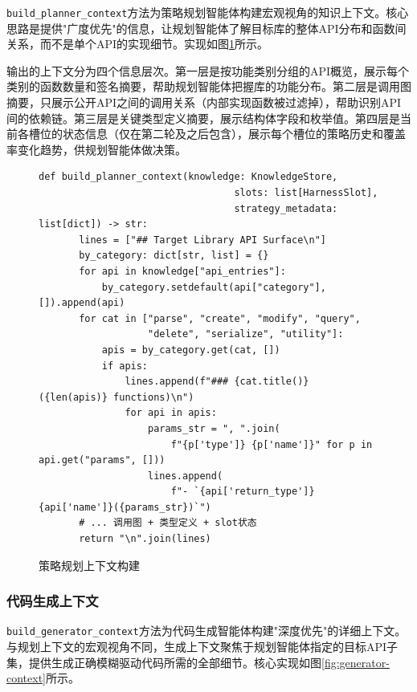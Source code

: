 \texttt{build\_planner\_context}方法为策略规划智能体构建宏观视角的知识上下文。核心思路是提供"广度优先"的信息，让规划智能体了解目标库的整体API分布和函数间关系，而不是单个API的实现细节。实现如图\ref{fig:planner-context}所示。

输出的上下文分为四个信息层次。第一层是按功能类别分组的API概览，展示每个类别的函数数量和签名摘要，帮助规划智能体把握库的功能分布。第二层是调用图摘要，只展示公开API之间的调用关系（内部实现函数被过滤掉），帮助识别API间的依赖链。第三层是关键类型定义摘要，展示结构体字段和枚举值。第四层是当前各槽位的状态信息（仅在第二轮及之后包含），展示每个槽位的策略历史和覆盖率变化趋势，供规划智能体做决策。

\begin{figure}[H]
    \centering
    \begin{lstlisting}[style=style@python]
   def build_planner_context(knowledge: KnowledgeStore,
                                  slots: list[HarnessSlot],
                                  strategy_metadata: list[dict]) -> str:
       lines = ["## Target Library API Surface\n"]
       by_category: dict[str, list] = {}
       for api in knowledge["api_entries"]:
           by_category.setdefault(api["category"], []).append(api)
       for cat in ["parse", "create", "modify", "query",
                   "delete", "serialize", "utility"]:
           apis = by_category.get(cat, [])
           if apis:
               lines.append(f"### {cat.title()} ({len(apis)} functions)\n")
               for api in apis:
                   params_str = ", ".join(
                       f"{p['type']} {p['name']}" for p in api.get("params", []))
                   lines.append(
                       f"- `{api['return_type']} {api['name']}({params_str})`")
       # ... 调用图 + 类型定义 + slot状态
       return "\n".join(lines)
    \end{lstlisting}
    \caption{策略规划上下文构建}
    \label{fig:planner-context}
\end{figure}

\subsubsection{代码生成上下文}

\texttt{build\_generator\_context}方法为代码生成智能体构建"深度优先"的详细上下文。与规划上下文的宏观视角不同，生成上下文聚焦于规划智能体指定的目标API子集，提供生成正确模糊驱动代码所需的全部细节。核心实现如图\ref{fig:generator-context}所示。

